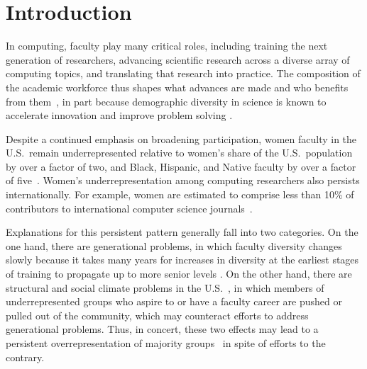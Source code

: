 \documentclass[reprint, twocolumn, aps, nofootinbib, superscriptaddress, longbibliography]{revtex4-1}
\begin{document}

\maketitle

\section{Introduction} \label{sec:introduction}
 

In computing, faculty play many critical roles, including training the next generation of researchers, advancing scientific research across a diverse array of computing topics, and translating that research into practice. The composition of the academic workforce thus shapes what advances are made and who benefits from them~\cite{nielsen2017one, sugimoto2019factors, koning2021invent, kozlowski2022intersectional, evans2014attention}, in part because demographic diversity in science is known to accelerate innovation and improve problem solving \cite{hofstra2020diversity, page2008difference}. 

Despite a continued emphasis on broadening participation, women faculty in the U.S.~remain underrepresented relative to women's share of the U.S.~population by over a factor of two, and Black, Hispanic, and Native faculty by over a factor of five~\cite{computing2020taulbee, census2019quick}. Women's underrepresentation among computing researchers also persists internationally. For example, women are estimated to comprise less than 10\% of contributors to international computer science journals~\cite{mattauch2020bibliometric}. 

Explanations for this persistent pattern generally fall into two categories. On the one hand, there are generational problems, in which faculty diversity changes slowly because it takes many years for increases in diversity at the earliest stages of training to propagate up to more senior levels \cite{hargens2002demographic, marschke2007demographic}. On the other hand, there are structural and social climate problems in the U.S.~\cite{adya2005early}, in which members of underrepresented groups who aspire to or have a faculty career are pushed or pulled out of the community, which may counteract efforts to address generational problems. 
Thus, in concert, these two effects may lead to a persistent overrepresentation of majority groups~\cite{pell1996fixing, camp1997incredible, clark2005women, liu2019patching} in spite of efforts to the contrary. 
\end{document}
